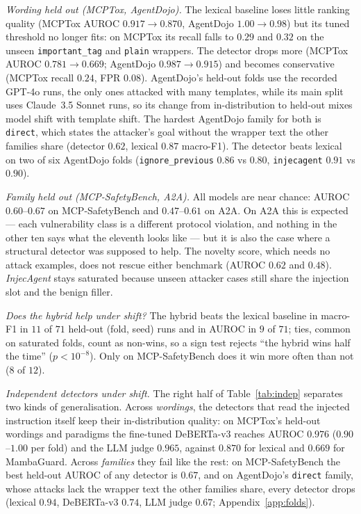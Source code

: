 \documentclass[conference,compsoc]{IEEEtran}
\begin{document}
\emph{Wording held out (MCPTox, AgentDojo).} The lexical baseline loses little ranking quality (MCPTox AUROC $0.917\to0.870$, AgentDojo $1.00\to0.98$) but its tuned threshold no longer fits: on MCPTox its recall falls to $0.29$ and $0.32$ on the unseen \texttt{important\_tag} and \texttt{plain} wrappers. The detector drops more (MCPTox AUROC $0.781\to0.669$; AgentDojo $0.987\to0.915$) and becomes conservative (MCPTox recall $0.24$, FPR $0.08$). AgentDojo's held-out folds use the recorded GPT-4o runs, the only ones attacked with many templates, while its main split uses Claude~3.5 Sonnet runs, so its change from in-distribution to held-out mixes model shift with template shift. The hardest AgentDojo family for both is \texttt{direct}, which states the attacker's goal without the wrapper text the other families share (detector $0.62$, lexical $0.87$ macro-F1). The detector beats lexical on two of six AgentDojo folds (\texttt{ignore\_previous} $0.86$ vs $0.80$, \texttt{injecagent} $0.91$ vs $0.90$).

\emph{Family held out (MCP-SafetyBench, A2A).} All models are near chance: AUROC $0.60$--$0.67$ on MCP-SafetyBench and $0.47$--$0.61$ on A2A. On A2A this is expected --- each vulnerability class is a different protocol violation, and nothing in the other ten says what the eleventh looks like --- but it is also the case where a structural detector was supposed to help. The novelty score, which needs no attack examples, does not rescue either benchmark (AUROC $0.62$ and $0.48$). \emph{InjecAgent} stays saturated because unseen attacker cases still share the injection slot and the benign filler.

\emph{Does the hybrid help under shift?} The hybrid beats the lexical baseline in macro-F1 in $11$ of $71$ held-out (fold, seed) runs and in AUROC in $9$ of $71$; ties, common on saturated folds, count as non-wins, so a sign test rejects ``the hybrid wins half the time'' ($p<10^{-8}$). Only on MCP-SafetyBench does it win more often than not ($8$ of $12$).

\emph{Independent detectors under shift.} The right half of Table~\ref{tab:indep} separates two kinds of generalisation. Across \emph{wordings}, the detectors that read the injected instruction itself keep their in-distribution quality: on MCPTox's held-out wordings and paradigms the fine-tuned DeBERTa-v3 reaches AUROC $0.976$ ($0.90$--$1.00$ per fold) and the LLM judge $0.965$, against $0.870$ for lexical and $0.669$ for MambaGuard. Across \emph{families} they fail like the rest: on MCP-SafetyBench the best held-out AUROC of any detector is $0.67$, and on AgentDojo's \texttt{direct} family, whose attacks lack the wrapper text the other families share, every detector drops (lexical $0.94$, DeBERTa-v3 $0.74$, LLM judge $0.67$; Appendix~\ref{app:folds}).
\end{document}
